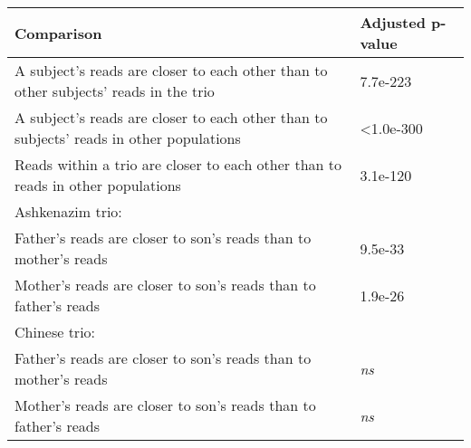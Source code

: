 \begin{samepage} \begin{table}[h!] \small \begin{tabular}{ll}
\hline
\textbf{Comparison}                                                                     & \textbf{Adjusted p-value} \\
\hline
A subject's reads are closer to each other than to other subjects' reads in the trio    & 7.7e-223                  \\
A subject's reads are closer to each other than to subjects' reads in other populations & <1.0e-300                 \\
Reads within a trio are closer to each other than to reads in other populations         & 3.1e-120                  \\
Ashkenazim trio:                                                                        & \textbf{}                 \\
Father's reads are closer to son's reads than to mother's reads                         & 9.5e-33                   \\
Mother's reads are closer to son's reads than to father's reads                         & 1.9e-26                   \\
Chinese trio:                                                                           & \textbf{}                 \\
Father's reads are closer to son's reads than to mother's reads                         & \textit{ns}               \\
Mother's reads are closer to son's reads than to father's reads                         & \textit{ns}               \\
\hline
\end{tabular}
\caption{}
\label{}
\end{table}
\end{samepage}
